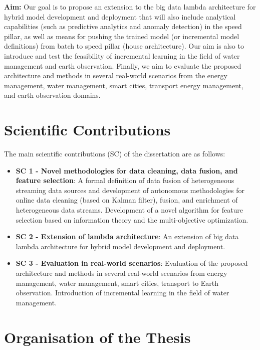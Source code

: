 \begin{itemize}
    \textbf{Aim:}
    Our goal is to propose an extension to the big data lambda architecture for hybrid model development and deployment that will also include analytical capabilities (such as predictive analytics and anomaly detection) in the speed pillar, as well as means for pushing the trained model (or incremental model definitions) from batch to speed pillar (house architecture).
    Our aim is also to introduce and test the feasibility of incremental learning in the field of water management and earth observation.
    Finally, we aim to evaluate the proposed architecture and methods in several real-world scenarios from the energy management, water management, smart cities, transport energy management, and earth observation domains.
    
\end{itemize}

\section{Scientific Contributions}

The main scientific contributions (SC) of the dissertation are as follows:

\begin{itemize}    
    \item \textbf{SC 1 - Novel methodologies for data cleaning, data fusion, and feature selection}: A formal definition of data fusion of heterogeneous streaming data sources and development of autonomous methodologies for online data cleaning (based on Kalman filter), fusion, and enrichment of heterogeneous data streams. Development of a novel algorithm for feature selection based on information theory and the multi-objective optimization.    
    
    \item \textbf{SC 2 - Extension of lambda architecture}: An extension of big data lambda architecture for hybrid model development and deployment.  
    
    \item \textbf{SC 3 - Evaluation in real-world scenarios}: Evaluation of the proposed architecture and methods in several real-world scenarios from energy management, water management, smart cities, transport to Earth observation. Introduction of incremental learning in the field of water management.
\end{itemize}

\section{Organisation of the Thesis}

